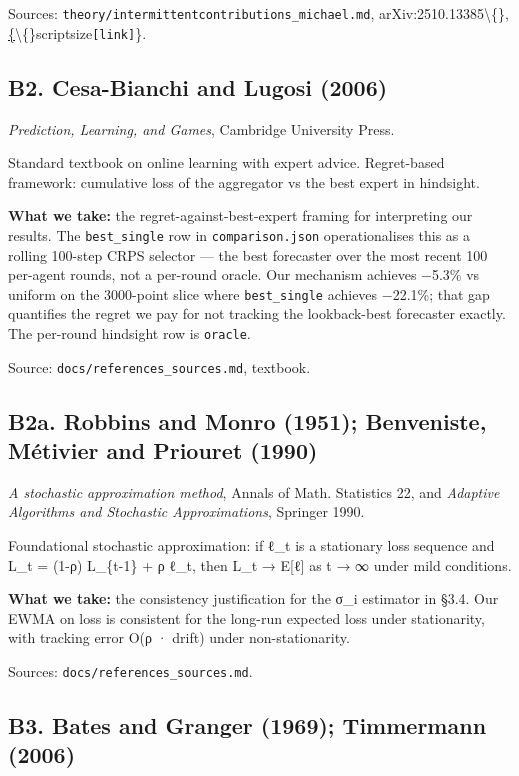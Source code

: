 \documentclass[11pt,a4paper,openany]{report}
\begin{document}
Sources: \texttt{theory/intermittentcontributions\_michael.md},
arXiv:2510.13385\textbackslash\{\},\href{https://arxiv.org/abs/2510.13385}\{\textbackslash\{\}scriptsize\texttt{[link]}\}.

\subsection{B2. Cesa-Bianchi and Lugosi (2006)}

\emph{Prediction, Learning, and Games}, Cambridge University Press.

Standard textbook on online learning with expert advice. Regret-based
framework: cumulative loss of the aggregator vs the best expert in
hindsight.

\textbf{What we take:} the regret-against-best-expert framing for
interpreting our results. The \texttt{best\_single} row in \texttt{comparison.json}
operationalises this as a rolling 100-step CRPS selector — the best
forecaster over the most recent 100 per-agent rounds, not a per-round
oracle. Our mechanism achieves −5.3\% vs uniform on the 3000-point
slice where \texttt{best\_single} achieves −22.1\%; that gap quantifies the
regret we pay for not tracking the lookback-best forecaster exactly.
The per-round hindsight row is \texttt{oracle}.

Source: \texttt{docs/references\_sources.md}, textbook.

\subsection{B2a. Robbins and Monro (1951); Benveniste, Métivier and Priouret (1990)}

\emph{A stochastic approximation method}, Annals of Math. Statistics 22,
and \emph{Adaptive Algorithms and Stochastic Approximations}, Springer 1990.

Foundational stochastic approximation: if ℓ\_t is a stationary loss
sequence and L\_t = (1-ρ) L\_\{t-1\} + ρ ℓ\_t, then L\_t → E[ℓ] as t → ∞
under mild conditions.

\textbf{What we take:} the consistency justification for the σ\_i estimator
in §3.4. Our EWMA on loss is consistent for the long-run expected
loss under stationarity, with tracking error O(ρ · drift) under
non-stationarity.

Sources: \texttt{docs/references\_sources.md}.

\subsection{B3. Bates and Granger (1969); Timmermann (2006)}
\end{document}
